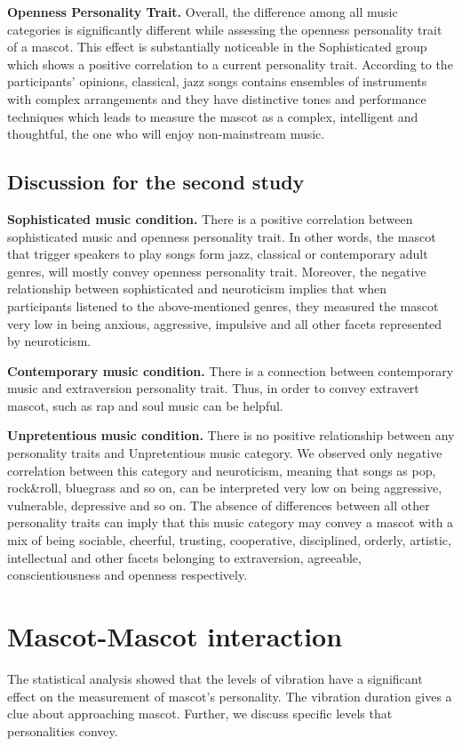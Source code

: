 \par \textbf{Openness Personality Trait.} Overall, the difference among all music categories is significantly different while assessing the openness personality trait of a mascot. This effect is substantially noticeable in the Sophisticated group which shows a positive correlation to a current personality trait. According to the participants’ opinions, classical, jazz songs contains ensembles of instruments with complex arrangements and they have distinctive tones and performance techniques which leads to measure the mascot as a complex, intelligent and thoughtful, the one who will enjoy non-mainstream music. 

\subsection{Discussion for the second study}
\par \textbf{Sophisticated music condition.} There is a positive correlation between sophisticated music and openness personality trait. In other words, the mascot that trigger speakers to play songs form jazz, classical or contemporary adult genres, will mostly convey openness personality trait. Moreover, the negative relationship between sophisticated and neuroticism implies that when participants listened to the above-mentioned genres, they measured the mascot very low in being anxious, aggressive, impulsive and all other facets represented by neuroticism.
\par \textbf{Contemporary music condition.} There is a connection between contemporary music and extraversion personality trait. Thus, in order to convey extravert mascot, such as rap and soul music can be helpful.
\par \textbf{Unpretentious music condition.} There is no positive relationship between any personality traits and Unpretentious music category. We observed only negative correlation between this category and neuroticism, meaning that songs as pop, rock\&roll, bluegrass and so on, can be interpreted very low on being aggressive, vulnerable, depressive and so on. The absence of differences between all other personality traits can imply that this music category may convey a mascot with a mix of being sociable, cheerful, trusting, cooperative, disciplined, orderly, artistic, intellectual and other facets belonging to extraversion, agreeable, conscientiousness and openness respectively. 

\section{Mascot-Mascot interaction}
The statistical analysis showed that the levels of vibration have a significant effect on the measurement of mascot’s personality. The vibration duration gives a clue about approaching mascot. Further, we discuss specific levels that personalities convey.


